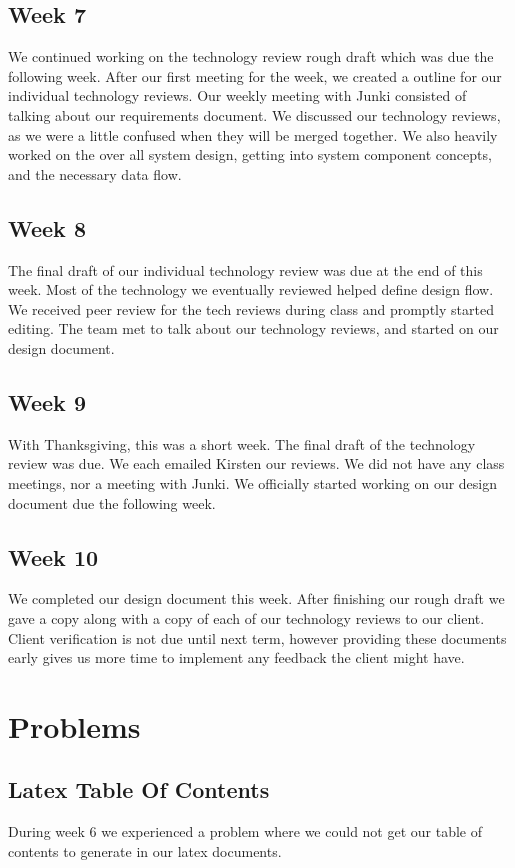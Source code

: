 \documentclass[onecolumn, draftclsnofoot,10pt, compsoc]{IEEEtran}
\begin{document}
		\subsection{Week 7}
		We continued working on the technology review rough draft which was due the following week.
		After our first meeting for the week, we created a outline for our individual technology reviews.
		Our weekly meeting with Junki consisted of talking about our requirements document.
		We discussed our technology reviews, as we were a little confused when they will be merged together.
		We also heavily worked on the over all system design, getting into system component concepts, and the necessary data flow.

		\subsection{Week 8}
		The final draft of our individual technology review was due at the end of this week. Most of the technology we eventually reviewed helped define design flow.
		We received peer review for the tech reviews during class and promptly started editing.
		The team met to talk about our technology reviews, and started on our design document.

		\subsection{Week 9}
		With Thanksgiving, this was a short week. The final draft of the technology review was due. We each emailed Kirsten our reviews.
		We did not have any class meetings, nor a meeting with Junki.
		We officially started working on our design document due the following week.

		\subsection{Week 10}
		We completed our design document this week. After finishing our rough draft we gave a copy along with a copy of each of our technology reviews to our client.
		Client verification is not due until next term, however providing these documents early gives us more time to implement any feedback the client might have.

		\section{Problems}
			\subsection{Latex Table Of Contents}
			During week 6 we experienced a problem where we could not get our table
			of contents to generate in our latex documents.
\end{document}
